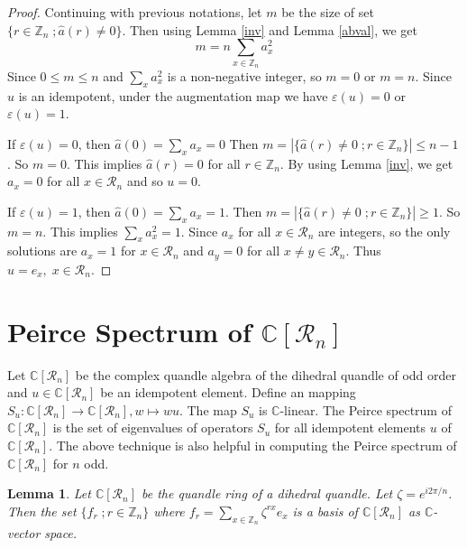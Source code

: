 \documentclass[10pt,twoside,reqno]{amsart}
\newtheorem{lemma}[theorem]{Lemma}
\theoremstyle{definition}
\numberwithin{equation}{section}
\begin{document}
\begin{proof}
Continuing with previous notations, let $m$ be the size of set $\{r \in \mathbb Z_n\;;\hat{a}(r)\neq 0\}$. Then using Lemma \ref{inv} and Lemma \ref{abval}, we get 
\[ m=n \sum\limits_{x\in \mathbb Z_n}a_x^2\]
Since $0\leq m\leq n$ and $\sum\limits_{x}a_x^2$ is a non-negative integer, so $m=0$ or $m=n$.
Since $u$ is an idempotent, under the augmentation map we have $\varepsilon(u)=0$ or $\varepsilon(u)=1$.

If $\varepsilon(u)=0$, then $ \hat{a}(0)=\sum\limits_{x}a_x=0$
Then $m = |\{\hat{a}(r)\neq 0\;; r\in \mathbb Z_n\}|\leq n-1$. So $m=0$. This implies $\hat{a}(r)=0$ for all $r\in \mathbb Z_n$. By using Lemma \ref{inv}, we get $a_x=0$ for all $x\in \mathcal R_n$ and so $u=0$.

If $\varepsilon(u)=1$, then $\hat{a}(0)=\sum\limits_{x}a_x=1$. Then $m = | \{\hat{a}(r)\neq 0\;; r\in \mathbb Z_n\}|\geq 1$. So $m=n$. This implies $\sum\limits_{x}a_x^2=1$. Since $a_x$ for all $x\in \mathcal R_n$ are integers, so the only solutions are $a_x=1$ for $x\in \mathcal{R}_n$ and $a_y=0$ for all $x\neq y\in \mathcal R_n$. Thus $u=e_x,\;x\in \mathcal R_n$.


\end{proof}
\section{Peirce Spectrum of $\mathbb{C}[\mathcal{R}_n]$} \label{sec3}
Let $\mathbb{C}[\mathcal{R}_n]$ be the complex quandle algebra of the dihedral quandle of odd order and $u \in \mathbb C[\mathcal {R} _ n]$ be an idempotent element. Define an mapping $S_u: \mathbb C[\mathcal R_n] \rightarrow \mathbb C[\mathcal R_n], w\mapsto wu$. The map $S_u$ is $\mathbb C$-linear. The Peirce spectrum of $\mathbb C[\mathcal R_n]$ is the set of eigenvalues of operators $S_u$ for all idempotent elements $u$ of $\mathbb C[\mathcal R_n]$. The above technique is also helpful in computing the Peirce spectrum of $\mathbb C[\mathcal R_n]$ for $n$ odd.

\begin{lemma}
Let $\mathbb C[\mathcal R_n]$ be the quandle ring of a dihedral quandle. Let $\zeta=e^{i2\pi/n}$. Then the set $\{f_r\;; r\in \mathbb Z_n\}$ where $f_r= \sum\limits_{x\in \mathbb Z_n} \zeta^{rx}e_x$ is a basis of $\mathbb C[\mathcal R_n]$ as $\mathbb C$-vector space.
\end{lemma}
\end{document}
